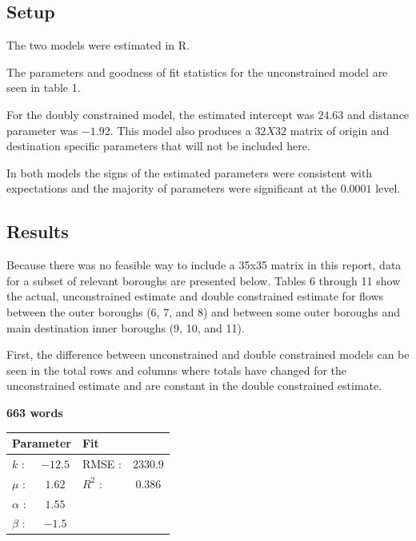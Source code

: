 \documentclass[11pt]{article} %
\begin{document}
\subsection{Setup}

The two models were estimated in R. 

The parameters and goodness of fit statistics for the unconstrained model are seen in table 1. 

For the doubly constrained model, the estimated intercept was $24.63$ and distance parameter was $-1.92$. This model also produces a $32 X 32 $ matrix of origin and destination specific parameters that will not be included here. 

In both models the signs of the estimated parameters were consistent with expectations and the majority of parameters were significant at the $0.0001$ level.

\subsection{Results}

Because there was no feasible way to include a 35x35 matrix in this report, data for a subset of relevant boroughs are presented below. Tables 6 through 11 show the actual, unconstrained estimate and double constrained estimate for flows between the outer boroughs (6, 7, and 8) and between some outer boroughs and main destination inner boroughs (9, 10, and 11). 



First, the difference between unconstrained and double constrained models can be seen in the total rows and columns where totals have changed for the unconstrained estimate and are constant in the double constrained estimate. 




\textbf{663 words}





\begin{center}
\begin{tabular}{lclc}
 \multicolumn{2}{l}{Parameter} 	& \multicolumn{2}{l}{Fit } \\ \hline	 
 $k$ : 		& $-12.5$ 	& RMSE :	&  $2330.9$	  	\\
 $\mu$ :	& $1.62$	& $R^2$ :	&  	$0.386$  	\\
 $\alpha$ :	& $1.55$	&  			&  	  			\\
 $\beta$ :	& $-1.5$	& 	 		&
\end{tabular}
\label{unconstrained}
\end{center} 
\end{document}
